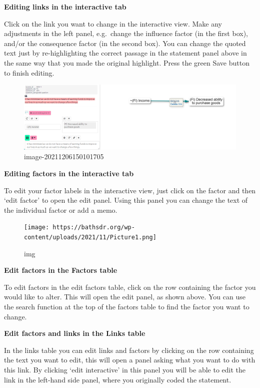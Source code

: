 \documentclass[
]{book}
\begin{document}
\textbf{Editing links in the interactive tab}

Click on the link you want to change in the interactive view. Make any adjustments in the left panel, e.g.~change the influence factor (in the first box), and/or the consequence factor (in the second box). You can change the quoted text just by re-highlighting the correct passage in the statement panel above in the same way that you made the original highlight. Press the green Save button to finish editing.

\begin{figure}
\centering
\includegraphics[width=6.77083in,height=\textheight]{_assets/image-20211206150101705.png}
\caption{image-20211206150101705}
\end{figure}

\textbf{Editing factors in the interactive tab}

To edit your factor labels in the interactive view, just click on the factor and then `edit factor' to open the edit panel. Using this panel you can change the text of the individual factor or add a memo.

\begin{figure}
\centering
\texttt{[image: https://bathsdr.org/wp-content/uploads/2021/11/Picture1.png]}
\caption{img}
\end{figure}

\textbf{Edit factors in the Factors table}

To edit factors in the edit factors table, click on the row containing the factor you would like to alter. This will open the edit panel, as shown above. You can use the search function at the top of the factors table to find the factor you want to change.

\textbf{Edit factors and links in the Links table}

In the links table you can edit links and factors by clicking on the row containing the text you want to edit, this will open a panel asking what you want to do with this link. By clicking `edit interactive' in this panel you will be able to edit the link in the left-hand side panel, where you originally coded the statement.
\end{document}

